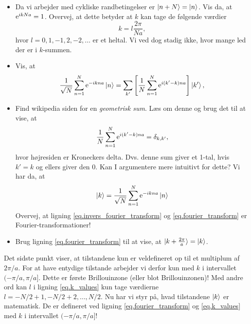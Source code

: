 \documentclass[11pt, a4paper]{article}
\def\te{{\rm e}}
\begin{document}
\begin{itemize}
	\item Da vi arbejder med cykliske randbetingelser er $\ket{n + N} = \ket{n}$. Vis da, at $\te^{ikNa} = 1$. Overvej, at dette betyder at $k$ kan tage de følgende værdier
	\begin{equation}
	k = l\frac{2\pi}{Na}, 
	\label{eq.k_values}
	\end{equation}
	hvor $l = 0, 1, -1, 2, -2, \dots$ er et heltal. Vi ved dog stadig ikke, hvor mange led der er i $k$-summen.

	\item Vis, at
	\begin{equation}
	\frac{1}{\sqrt{N}}\sum_{n = 1}^N \te^{-ik na}\ket{n} = \sum_{k'}\left[\frac{1}{N}\sum_{n = 1}^N \te^{i(k' - k)na}\right]\ket{k'},
	\end{equation}

	\item Find wikipedia siden for en \textit{geometrisk sum}. Læs om denne og brug det til at vise, at
	\begin{equation}
	\frac{1}{N}\sum_{n = 1}^N \te^{i(k' - k)na} = \delta_{k, k'},
	\label{eq.ortogonalitet}
	\end{equation}
	hvor højresiden er Kroneckers delta. Dvs. denne sum giver et 1-tal, hvis $k' = k$ og ellers giver den $0$. Kan I argumentere mere intuitivt for dette? Vi har da, at
	\begin{equation}
	\ket{k} = \frac{1}{\sqrt{N}}\sum_{n = 1}^N \te^{-ikna}\ket{n}
	\label{eq.fourier_transform}
	\end{equation}
	Overvej, at ligning \eqref{eq.invers_fourier_transform} og \eqref{eq.fourier_transform} er Fourier-transformationer! 

	\item Brug ligning \eqref{eq.fourier_transform} til at vise, at $\ket{k + \frac{2\pi}{a}} = \ket{k}$. 
\end{itemize}
Det sidste punkt viser, at tilstandene kun er veldefineret op til et multiplum af $2\pi / a$. For at have entydige tilstande arbejder vi derfor kun med $k$ i intervallet $(- \pi / a, \pi / a]$. Dette er første Brillouinzone (eller blot Brillouinzonen)! Med andre ord kan $l$ i ligning \eqref{eq.k_values} kun tage værdierne $l = - N / 2 + 1, - N / 2 + 2, \dots, N / 2$. Nu har vi styr på, hvad tilstandene $\ket{k}$ er matematisk. De er defineret ved ligning \eqref{eq.fourier_transform} og \eqref{eq.k_values} med $k$ i intervallet $(- \pi / a, \pi / a]$! \\
\end{document}
